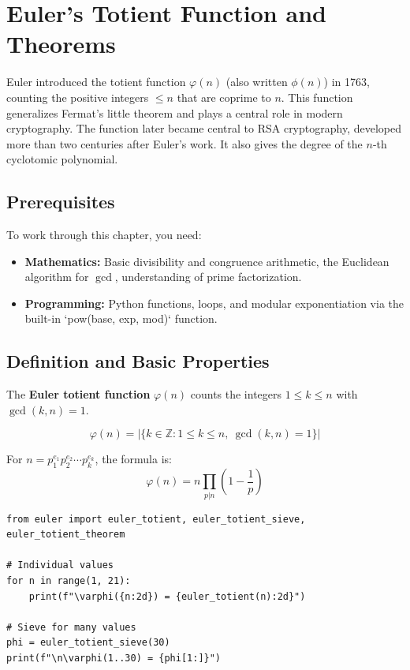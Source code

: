 
\chapter{Euler's Totient Function and Theorems}

\begin{historical}
Euler introduced the totient function $\varphi(n)$ (also written $\phi(n)$) in 1763,
counting the positive integers $\le n$ that are coprime to $n$. This function
generalizes Fermat's little theorem and plays a central role in modern cryptography.
The function later became central to RSA cryptography, developed more than two
centuries after Euler's work. It also gives the degree of the $n$-th cyclotomic
polynomial. \cite{euler1763}\end{historical}

\section{Prerequisites}

To work through this chapter, you need:
\begin{itemize}
    \item \textbf{Mathematics:} Basic divisibility and congruence arithmetic, the Euclidean algorithm for $\gcd$, understanding of prime factorization.
    \item \textbf{Programming:} Python functions, loops, and modular exponentiation via the built-in `pow(base, exp, mod)` function.
\end{itemize}

\section{Definition and Basic Properties}

The \textbf{Euler totient function} $\varphi(n)$ counts the integers $1 \le k \le n$ with $\gcd(k,n) = 1$.

\[
\varphi(n) = |\{k \in \mathbb{Z} : 1 \le k \le n,\ \gcd(k,n) = 1\}|
\]

For $n = p_1^{e_1} p_2^{e_2} \cdots p_k^{e_k}$, the formula is:
\[
\varphi(n) = n \prod_{p|n} \left(1 - \frac{1}{p}\right)
\]

\begin{lstlisting}[caption={Computing the totient function}, label=lst:totient]
from euler import euler_totient, euler_totient_sieve, euler_totient_theorem

# Individual values
for n in range(1, 21):
    print(f"\varphi({n:2d}) = {euler_totient(n):2d}")

# Sieve for many values
phi = euler_totient_sieve(30)
print(f"\n\varphi(1..30) = {phi[1:]}")
\end{lstlisting}

